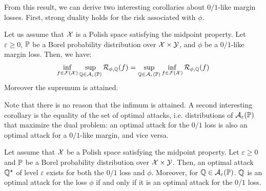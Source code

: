 From this result, we can derive two interesting corollaries about  $0/1$-like margin losses. First, strong duality holds for the risk associated with ${\phi}$.

\begin{coro} 
\label{coro:nash}
Let us assume that $\mathcal{X}$ is a Polish space satisfying the midpoint property. Let $\varepsilon\geq 0$, $\mathbb{P}$ be a Borel probability distribution over $\mathcal{X}\times\mathcal{Y}$, and ${\phi}$ be a $0/1$-like margin loss. Then, we have:
\begin{align*}
\inf_{f\in\mathcal{F}(\mathcal{X})}\sup_{\mathbb{Q}\in\mathcal{A}_\varepsilon(\mathbb{P})} \mathcal{R}_{\phi,\mathbb{Q}}(f) =    \sup_{\mathbb{Q}\in\mathcal{A}_\varepsilon(\mathbb{P})} \inf_{f\in\mathcal{F}(\mathcal{X})} \mathcal{R}_{\phi,\mathbb{Q}}(f)
\end{align*}
Moreover the supremum is attained.
\end{coro}

Note that there is no reason that the infimum is attained. A second interesting corollary is the equality of the set of optimal attacks, i.e. distributions of $\mathcal{A}_\varepsilon(\mathbb{P})$ that maximize the dual problem:  an optimal attack for the $0/1$ loss is also an optimal attack for a  $0/1$-like margin, and vice versa.


\begin{coro}
\label{coro:optattacks}
Let assume that $\mathcal{X}$ be a Polish space satisfying the midpoint property. Let $\varepsilon\geq 0$ and $\mathbb{P}$ be a Borel probability distribution over $\mathcal{X}\times\mathcal{Y}$. Then, an optimal attack $\mathbb{Q}^\star$  of level $\varepsilon$  exists for both the $0/1$ loss and  $\phi$. Moreover, for $\mathbb{Q}\in\mathcal{A}_\varepsilon(\mathbb{P})$.  $\mathbb{Q}$ is an optimal attack for the loss $\phi$  if and only if it is an optimal attack for the $0/1$ loss.
\end{coro}


